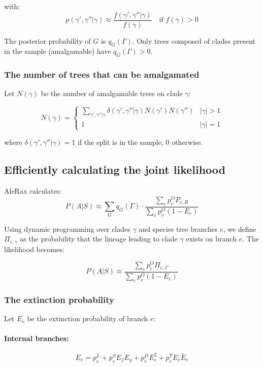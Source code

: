 with:
\[
p(\gamma', \gamma''|\gamma) \approx \frac{f(\gamma', \gamma''|\gamma)}{f(\gamma)} \quad \text{if } f(\gamma) > 0
\]

The posterior probability of $G$ is $q_G(\Gamma)$.  
Only trees composed of clades present in the sample (amalgamable) have $q_G(\Gamma) > 0$.

\subsubsection{The number of trees that can be amalgamated}

Let $N(\gamma)$ be the number of amalgamable trees on clade $\gamma$:

\[
N(\gamma) = 
\begin{cases}
  \sum_{\gamma',\gamma''|\gamma} \delta(\gamma',\gamma''|\gamma) N(\gamma') N(\gamma'') & |\gamma| > 1 \\
  1 & |\gamma| = 1
\end{cases}
\]

where $\delta(\gamma',\gamma''|\gamma) = 1$ if the split is in the sample, 0 otherwise.

\subsection{Efficiently calculating the joint likelihood}

AleRax calculates:
\[
P(A|S) \approx \sum_G q_G(\Gamma) \cdot \frac{\sum_e p^O_e P_{e,R}}{\sum_e p^O_e (1 - E_e)}
\]

Using dynamic programming over clades $\gamma$ and species tree branches $e$, we define $\Pi_{e,\gamma}$ as the probability that the lineage leading to clade $\gamma$ exists on branch $e$. The likelihood becomes:

\[
P(A|S) \approx \frac{\sum_e p^O_e \Pi_{e,\Gamma}}{\sum_e p^O_e (1 - E_e)}
\]

\subsubsection{The extinction probability}

Let $E_e$ be the extinction probability of branch $e$:

\paragraph{Internal branches:}
\[
E_e = p^L_e + p^S_e E_f E_g + p^D_e E_e^2 + p^T_e E_e \bar{E}_e
\]

